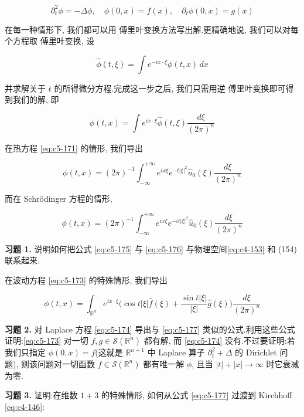 \begin{equation}
\partial_t^2\phi = -\Delta\phi, \quad \phi(0, x) = f(x), \quad \partial_t\phi(0, x) = g(x)\label{eq:c5-174}
\end{equation}

在每一种情形下, 我们都可以用 傅里叶变换方法写出解.更精确地说, 我们可以对每个方程取 傅里叶变换, 设

\[
\hat{\phi}(t, \xi) = \int e^{-ix\cdot\xi}\phi(t, x)\, dx
\]

并求解关于 $t$ 的所得微分方程.完成这一步之后, 我们只需用逆 傅里叶变换即可得到我们的解, 即

\[
\phi(t, x) = \int e^{ix\cdot\xi}\hat{\phi}(t, \xi)\frac{d\xi}{(2\pi)^n}
\]

在热方程 \eqref{eq:c5-171} 的情形, 我们导出

\begin{equation}
\phi(t, x) = (2\pi)^{-1}\int_{-\infty}^{+\infty} e^{ix\xi}e^{-t|\xi|^2}\hat{u}_0(\xi)\frac{d\xi}{(2\pi)^n}\label{eq:c5-175}
\end{equation}

而在 Schrödinger 方程的情形,

\begin{equation}
\phi(t, x) = (2\pi)^{-1}\int_{-\infty}^{+\infty} e^{ix\xi}e^{-it|\xi|^2}\hat{u}_0(\xi)\frac{d\xi}{(2\pi)^n}\label{eq:c5-176}
\end{equation}

\textbf{习题 1.} 说明如何把公式 \eqref{eq:c5-175} 与 \eqref{eq:c5-176} 与物理空间\eqref{eq:c4-153} 和 (154) 联系起来.

在波动方程 \eqref{eq:c5-173} 的特殊情形, 我们导出

\begin{equation}
\phi(t, x) = \int_{\mathbb{R}^n} e^{ix\cdot\xi}\Big(\cos t|\xi|\hat{f}(\xi) + \frac{\sin t|\xi|}{|\xi|}\hat{g}(\xi)\Big)\frac{d\xi}{(2\pi)^n}\label{eq:c5-177}
\end{equation}

\textbf{习题 2.} 对 Laplace 方程 \eqref{eq:c5-174} 导出与 \eqref{eq:c5-177} 类似的公式.利用这些公式证明:\eqref{eq:c5-173} 对一切 $f, g\in\mathcal{S}(\mathbb{R}^n)$ 都有解, 而 \eqref{eq:c5-174} 没有.不过要证明:若我们只指定 $\phi(0, x) = f$(这就是 $\mathbb{R}^{n+1}$ 中 Laplace 算子 $\partial_t^2+\Delta$ 的 Dirichlet 问题), 则该问题对一切函数 $f\in\mathcal{S}(\mathbb{R}^n)$ 都有唯一解 $\phi$, 且当 $|t|+|x|\to\infty$ 时它衰减为零.

\textbf{习题 3.} 证明:在维数 $1+3$ 的特殊情形, 如何从公式 \eqref{eq:c5-177} 过渡到 Kirchhoff \eqref{eq:c4-146}:

